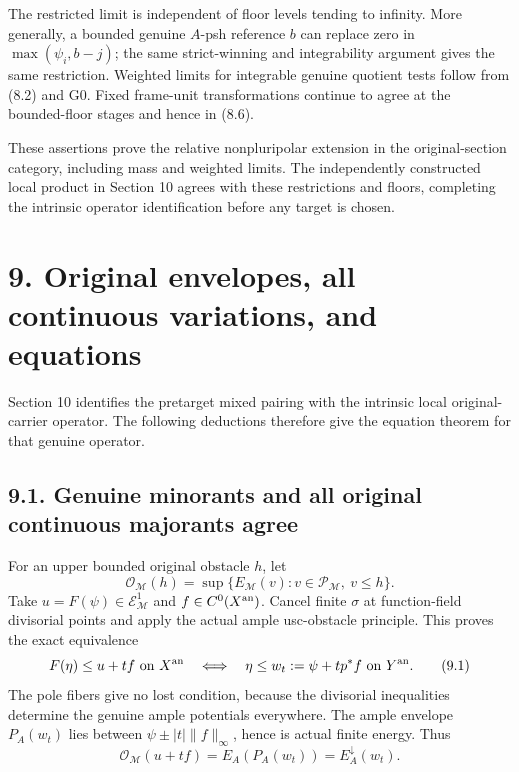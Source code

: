 \documentclass[
  10pt,
]{article}
\begin{document}
The restricted limit is independent of floor levels tending to infinity.
More generally, a bounded genuine \(A\)-psh reference \(b\) can replace
zero in \(\max(\psi_i,b-j)\); the same strict-winning and integrability
argument gives the same restriction. Weighted limits for integrable
genuine quotient tests follow from (8.2) and G0. Fixed frame-unit
transformations continue to agree at the bounded-floor stages and hence
in (8.6).

These assertions prove the relative nonpluripolar extension in the
original-section category, including mass and weighted limits. The
independently constructed local product in Section 10 agrees with these
restrictions and floors, completing the intrinsic operator
identification before any target is chosen.

\section{9. Original envelopes, all continuous variations, and
equations}\label{original-envelopes-all-continuous-variations-and-equations}

Section 10 identifies the pretarget mixed pairing with the intrinsic
local original-carrier operator. The following deductions therefore give
the equation theorem for that genuine operator.

\subsection{9.1. Genuine minorants and all original continuous majorants
agree}\label{genuine-minorants-and-all-original-continuous-majorants-agree}

For an upper bounded original obstacle \(h\), let
\[\mathscr O_{\mathcal M}(h)=\sup\{E_{\mathcal M}(v):v\in\mathcal P_{\mathcal M},\ v\leq h\}.\]
Take \(u=F(\psi)\in\mathcal E^1_{\mathcal M}\) and
\(f\in C^0(X^{\rm an})\). Cancel finite \(\sigma\) at function-field
divisorial points and apply the actual ample usc-obstacle principle.
This proves the exact equivalence
\[F(\eta)\leq u+tf\text{ on }X^{\rm an}\quad\Longleftrightarrow\quad
\eta\leq w_t:=\psi+t p^*f\text{ on }Y^{\rm an}.           \tag{9.1}\]
The pole fibers give no lost condition, because the divisorial
inequalities determine the genuine ample potentials everywhere. The
ample envelope \(P_A(w_t)\) lies between \(\psi\pm |t|\|f\|_\infty\),
hence is actual finite energy. Thus
\[\mathscr O_{\mathcal M}(u+tf)=E_A(P_A(w_t))=E_A^\downarrow(w_t). \tag{9.2}\]
\end{document}
